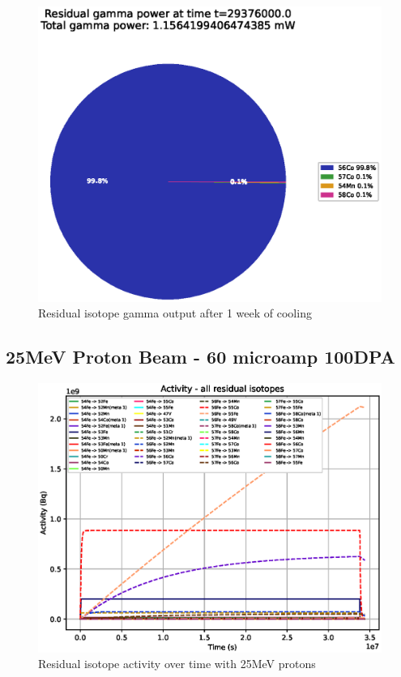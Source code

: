 \begin{figure}[!htb]
\centering
\includegraphics[width=0.7\linewidth]{chapters/activity_code/fe_100dpa/endofbeam/20MeV_0500_29376000.eps}
\caption{Residual isotope gamma output after 1 week of cooling}
\label{fig:20mev-proton-100dpa}
\end{figure}



\clearpage
\FloatBarrier
\subsection{25MeV Proton Beam - 60 microamp 100DPA}

\begin{figure}[!htb]
\centering
\includegraphics[width=0.7\linewidth]{chapters/activity_code/fe_100dpa/by_isotope/25MeV_all_radioactive_isotopes.eps}
\caption{Residual isotope activity over time with 25MeV protons}
\label{fig:25mev-proton-100dpa-activity}
\end{figure}

